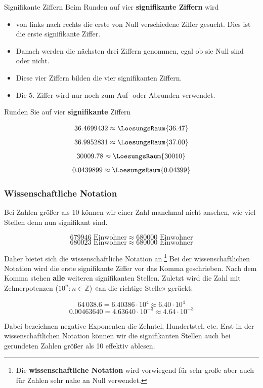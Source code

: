 \begin{rezept}{Signifikante Ziffern}{}
  Beim Runden auf vier \textbf{signifikante Ziffern} wird
  \begin{itemize}
  \item  von links nach rechts die erste von Null verschiedene Ziffer gesucht. Dies ist die
    erste signifikante Ziffer.
  \item
    Danach werden die nächsten drei Ziffern
  genommen, egal ob sie Null sind oder nicht. 
\item   Diese vier Ziffern
  bilden die vier signifikanten Ziffern.
\item  Die 5. Ziffer wird nur noch zum Auf- oder Abrunden verwendet.
  \end{itemize}
\end{rezept}

Runden Sie auf vier \textbf{signifikante} Ziffern

$$36.4699432 \approx \LoesungsRaum{36.47}$$
$$36.9952831 \approx \LoesungsRaum{37.00}$$
$$30009.78   \approx \LoesungsRaum{30010}$$
$$0.0439899  \approx \LoesungsRaum{0.04399}$$
\newpage

  
\subsubsection{Wissenschaftliche Notation}\label{wissenschaftlicheNotation}
Bei Zahlen größer als 10 können wir einer Zahl manchmal nicht ansehen, wie viel Stellen denn nun signifikant sind.

$$ 679946 \textrm{\ Einwohner} \approx  680000 \textrm{\ Einwohner}$$
$$ 680023 \textrm{\ Einwohner} \approx  680000 \textrm{\ Einwohner}$$

Daher bietet sich die wissenschaftliche Notation an.\footnote{Die
\textbf{wissenschaftliche Notation} wird vorwiegend für sehr große
aber auch für Zahlen sehr nahe an Null verwendet.}
Bei der wissenschaftlichen Notation wird die erste signifikante Ziffer
vor das Komma geschrieben. Nach dem Komma stehen \textbf{alle} weiteren signifikanten Stellen.
Zuletzt wird die Zahl mit Zehnerpotenzen
($10^{n}: n \in \mathbb{Z}$) «an die richtige Stelle» gerückt:

$$64\,038.6  = 6.40386 \cdot 10^{ 4}\approx 6.40 \cdot 10^{ 4}$$
$$0.00463640 = 4.63640 \cdot 10^{-3}\approx 4.64 \cdot 10^{-3}$$

Dabei bezeichnen negative Exponenten die Zehntel, Hundertstel, etc.
Erst in der wissenschaftlichen Notation können wir die signifikanten Stellen auch bei gerundeten Zahlen größer als 10 effektiv ablesen.

